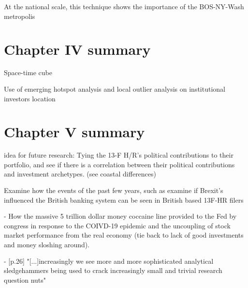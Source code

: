 At the national scale, this technique shows the importance of the BOS-NY-Wash metropolis 
     

  



\section{Chapter IV summary}

Space-time cube

Use of emerging hotspot analysis and local outlier analysis on institutional investors location



\section{Chapter V summary}


idea for future research: Tying the 13-F H/R's political contributions to their portfolio, and see if there is a correlation between their political contributions and investment archetypes. (see coastal differences) 

Examine how the events of the past few years, such as examine if Brexit's influenced the British banking system can be seen in British based 13F-HR filers

- How the massive 5 trillion dollar money coccaine line provided to the Fed by congress in response to the COIVD-19 epidemic and the uncoupling of stock market performance from the real economy (tie back to lack of good investments and money sloshing around). 










- \cite{harrison2019venture}[p.26] "[...]increasingly we see more and more sophisticated analytical sledgehammers being used to crack increasingly small and trivial research question nuts"

